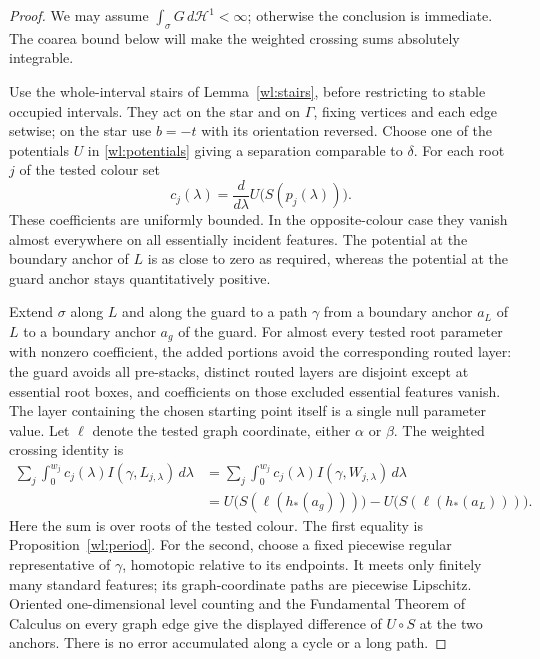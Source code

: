 \documentclass[11pt]{article}
\numberwithin{equation}{section}
\theoremstyle{definition}
\theoremstyle{remark}
\begin{document}
\begin{proof}
We may assume $\int_\sigma G\,d\mathcal H^1<\infty$; otherwise
the conclusion is immediate.  The coarea bound below will make the
weighted crossing sums absolutely integrable.

Use the whole-interval stairs of Lemma~\ref{wl:stairs}, before
restricting to stable occupied intervals.  They act on the star and
on $\Gamma$, fixing vertices and each edge setwise; on the star use
$b=-t$ with its orientation reversed.  Choose one of the potentials
$U$ in \eqref{wl:potentials} giving a separation comparable to
$\delta$.  For each root $j$ of the tested colour set
\begin{equation}\label{wl:crossing-coefficient}
 c_j(\lambda)=\frac{d}{d\lambda}
                 U\bigl(S(p_j(\lambda))\bigr).
\end{equation}
These coefficients are uniformly bounded.  In the opposite-colour
case they vanish almost everywhere on all essentially incident
features.  The potential at the boundary anchor of $L$ is as close
to zero as required, whereas the potential at the guard anchor stays
quantitatively positive.

Extend $\sigma$ along $L$ and along the guard to a path $\gamma$
from a boundary anchor $a_L$ of $L$ to a boundary anchor $a_g$ of
the guard.  For almost every tested root parameter with nonzero
coefficient, the added portions avoid the corresponding routed
layer: the guard avoids all pre-stacks, distinct routed layers are
disjoint except at essential root boxes, and coefficients on those
excluded essential features vanish.  The layer containing the
chosen starting point itself is a single null parameter value.
Let $\ell$ denote the tested graph coordinate, either $\alpha$ or
$\beta$.  The weighted crossing identity is
\begin{equation}\label{wl:weighted-period}
\begin{aligned}
 \sum_j\int_0^{w_j}c_j(\lambda)I(\gamma,L_{j,\lambda})\,d\lambda
 &=\sum_j\int_0^{w_j}c_j(\lambda)I(\gamma,W_{j,\lambda})\,d\lambda\\
 &=U\bigl(S(\ell(h_*(a_g)))\bigr)
       -U\bigl(S(\ell(h_*(a_L)))\bigr).
\end{aligned}
\end{equation}
Here the sum is over roots of the tested colour.  The first equality
is Proposition~\ref{wl:period}.  For the second, choose a fixed
piecewise regular representative of $\gamma$, homotopic relative
to its endpoints.  It meets only finitely many standard features;
its graph-coordinate
paths are piecewise Lipschitz.  Oriented one-dimensional level
counting and the Fundamental Theorem of Calculus on every graph
edge give the displayed difference of $U\circ S$ at the two anchors.
There is no error accumulated along a cycle or a long path.


\end{proof}
\end{document}
